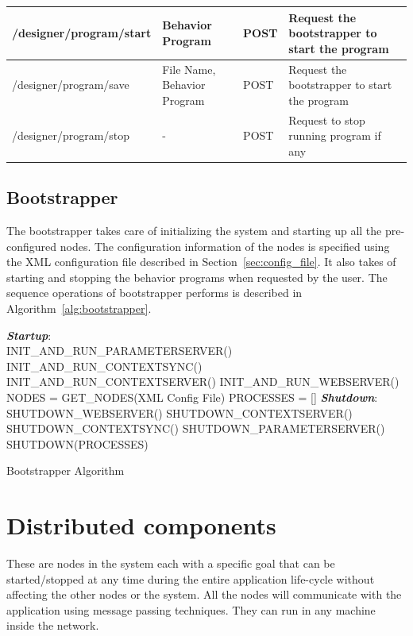 \begin{table}[H]
\begin{tabular}{|l|p{2.8cm}|p{1.2cm}|p{5.5cm}|}
  /designer/program/start & Behavior Program & POST  & Request the bootstrapper to start the program
  										                    \tabularnewline\hline   

  /designer/program/save & File Name, Behavior Program & POST  & Request the bootstrapper to start the program
                                          \tabularnewline\hline 
  /designer/program/stop & - & POST  & Request to stop running program if any
                                          \tabularnewline\hline
\end{tabular}
\end{table}
\subsection*{Bootstrapper} 
The bootstrapper takes care of initializing the system and starting up all the pre-configured nodes. The configuration information of the nodes is specified using the XML configuration file described in Section~\ref{sec:config_file}. It also takes of starting and stopping the behavior programs when requested by the user. The sequence operations of bootstrapper performs is described in Algorithm~\ref{alg:bootstrapper}.

\begin{algorithm}[H]
 \textbf{\emph{Startup}}:\\
 \quad INIT\_AND\_RUN\_PARAMETERSERVER()\;
 \quad INIT\_AND\_RUN\_CONTEXTSYNC()\;
 \quad INIT\_AND\_RUN\_CONTEXTSERVER()\;
 \quad INIT\_AND\_RUN\_WEBSERVER()\;
 \quad NODES = GET\_NODES(XML Config File)\;
 \quad PROCESSES = []\;
 \textbf{\emph{Shutdown}}:\\
 \quad SHUTDOWN\_WEBSERVER()\; 
 \quad SHUTDOWN\_CONTEXTSERVER()\;
 \quad SHUTDOWN\_CONTEXTSYNC()\;
 \quad SHUTDOWN\_PARAMETERSERVER()\;
 \quad SHUTDOWN(PROCESSES)
 \caption{Bootstrapper Algorithm}
 \label{alg:bootstrapper}
\end{algorithm}
\section{Distributed components}
\label{ssec:dist_comp}
These are nodes in the system each with a specific goal that can be started/stopped at any time during the entire application life-cycle without affecting the other nodes or the system. All the nodes will communicate with the application using message passing techniques. They can run in any machine inside the network.
